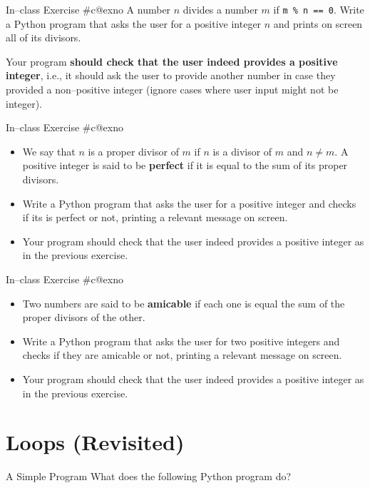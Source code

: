 \documentclass[aspectratio=169, 12pt, xcolor=table]{beamer}
\makeatletter
\newcommand{\arabicthree}[1]{\expandafter\@arabicthree\csname c@#1\endcsname}
\newcommand{\@arabicthree}[1]{\ifnum #1<100 0\fi\ifnum #1<10 0\fi\number#1}
\newcounter{exno}
\newcommand{\exno}{\stepcounter{exno}In--class Exercise \#\arabicthree{exno}}
\makeatother
\begin{document}
	\begin{frame}{\exno}
		A number $n$ divides a number $m$ if \texttt{m \% n == 0}. Write a Python program that asks the user for a positive integer $n$ and prints on screen all of its divisors.
		
		Your program \textbf{should check that the user indeed provides a positive integer}, i.e., it should ask the user to provide another number in case they provided a non--positive integer (ignore cases where user input might not be integer).
	\end{frame}
	
	\begin{frame}{\exno}
		\begin{itemize}
			\item We say that $n$ is a proper divisor of $m$ if $n$ is a divisor of $m$ and $n\neq m$. A positive integer is said to be \textbf{perfect} if it is equal to the sum of its proper divisors.
			\item Write a Python program that asks the user for a positive integer and checks if its is perfect or not, printing a relevant message on screen.
			\item Your program should check that the user indeed provides a positive integer as in the previous exercise.
		\end{itemize}
	\end{frame}
	
	\begin{frame}{\exno}
		\begin{itemize}
			\item Two numbers are said to be \textbf{amicable} if each one is equal the sum of the proper divisors of the other.
			\item Write a Python program that asks the user for two positive integers and checks if they are amicable or not, printing a relevant message on screen.
			\item Your program should check that the user indeed provides a positive integer as in the previous exercise.
		\end{itemize}
	\end{frame}

	\section{Loops (Revisited)}\label{sec:loops--revisited}
	
	\sectionframe
	
	\begin{frame}{A Simple Program}
		What does the following Python program do?
		
	\end{frame}
\end{document}
